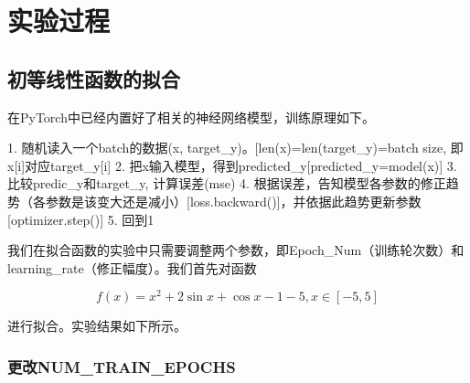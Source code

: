 \documentclass{article}
\begin{document}
\section{实验过程}

\subsection{初等线性函数的拟合}

在PyTorch中已经内置好了相关的神经网络模型，训练原理如下。

\begin{python}
1. 随机读入一个batch的数据(x, target_y)。[len(x)=len(target_y)=batch size, 即x[i]对应target_y[i]
2. 把x输入模型，得到predicted_y[predicted_y=model(x)]
3. 比较predic_y和target_y, 计算误差(mse)
4. 根据误差，告知模型各参数的修正趋势（各参数是该变大还是减小）[loss.backward()]，并依据此趋势更新参数[optimizer.step()]
5. 回到1
\end{python}

我们在拟合函数的实验中只需要调整两个参数，即Epoch\_Num（训练轮次数）和learning\_rate（修正幅度）。我们首先对函数

$$ f(x) = x^2 + 2\sin{x}+\cos{x-1}-5, x \in \left[-5,5\right]$$

进行拟合。实验结果如下所示。

\subsubsection{更改NUM\_TRAIN\_EPOCHS}
\end{document}
